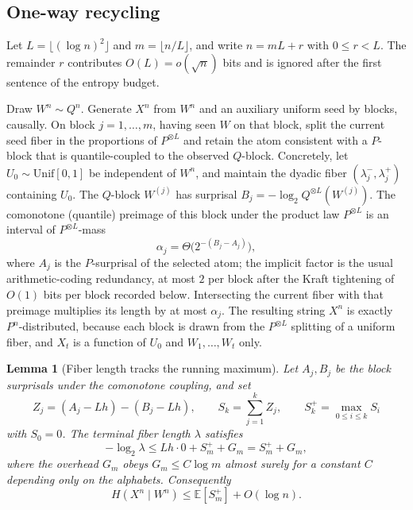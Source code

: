 \documentclass[11pt]{article}
\newtheorem{lemma}[theorem]{Lemma}
\theoremstyle{definition}
\newcommand{\E}{\mathbb{E}}
\begin{document}
\subsection{One-way recycling}

Let \(L=\lfloor(\log n)^2\rfloor\) and \(m=\lfloor n/L\rfloor\), and write \(n=mL+r\) with \(0\le r<L\).
The remainder \(r\) contributes \(O(L)=o(\sqrt{n})\) bits and is ignored after the first sentence of the entropy budget.

Draw \(W^n\sim Q^n\).
Generate \(X^n\) from \(W^n\) and an auxiliary uniform seed by blocks, causally.
On block \(j=1,\ldots,m\), having seen \(W\) on that block, split the current seed fiber in the proportions of \(P^{\otimes L}\) and retain the atom consistent with a \(P\)-block that is quantile-coupled to the observed \(Q\)-block.
Concretely, let \(U_0\sim\mathrm{Unif}[0,1]\) be independent of \(W^n\), and maintain the dyadic fiber \((\lambda_j^-,\lambda_j^+)\) containing \(U_0\).
The \(Q\)-block \(W^{(j)}\) has surprisal \(B_j=-\log_2 Q^{\otimes L}(W^{(j)})\).
The comonotone (quantile) preimage of this block under the product law \(P^{\otimes L}\) is an interval of \(P^{\otimes L}\)-mass
\[
  \alpha_j=\Theta\bigl(2^{-(B_j-A_j)}\bigr),
\]
where \(A_j\) is the \(P\)-surprisal of the selected atom; the implicit factor is the usual arithmetic-coding redundancy, at most \(2\) per block after the Kraft tightening of \(O(1)\) bits per block recorded below.
Intersecting the current fiber with that preimage multiplies its length by at most \(\alpha_j\).
The resulting string \(X^n\) is exactly \(P^n\)-distributed, because each block is drawn from the \(P^{\otimes L}\) splitting of a uniform fiber, and \(X_t\) is a function of \(U_0\) and \(W_1,\ldots,W_t\) only.

\begin{lemma}[Fiber length tracks the running maximum]
\label{lem:fiber}
Let \(A_j,B_j\) be the block surprisals under the comonotone coupling, and set
\[
  Z_j=(A_j-Lh)-(B_j-Lh),\qquad
  S_k=\sum_{j=1}^k Z_j,\qquad
  S_k^+=\max_{0\le i\le k} S_i
\]
with \(S_0=0\).
The terminal fiber length \(\lambda\) satisfies
\begin{equation}
  \label{eq:fiber}
  -\log_2\lambda
  \le
  Lh\cdot 0+S_m^++G_m
  =
  S_m^++G_m,
\end{equation}
where the overhead \(G_m\) obeys \(G_m\le C\log m\) almost surely for a constant \(C\) depending only on the alphabets.
Consequently
\[
  H(X^n\mid W^n)
  \le
  \E[S_m^+]+O(\log n).
\]
\end{lemma}
\end{document}
